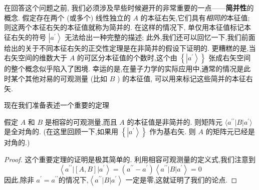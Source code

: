 \documentclass[lang=cn,newtx,10pt,scheme=chinese,thmcnt=section]{elegantbook}
\begin{document}
在回答这个问题之前, 我们必须涉及早些时候避开的非常重要的一点——\textbf{简并性}的概念. 假定存在两个 (或多个) 线性独立的 $A$ 的本征右矢,它们具有\textit{相同的}本征值; 则这两个本征右矢的本征值就称为简并的. 在这样的情况下, 单仅用本征值标记本征右矢的符号 $\left| {a}^{\prime }\right\rangle$ 无法给出一种完整的描述; 此外,我们还可以回忆一下,我们前面给出的关于不同本征右矢的正交性定理是在非简并的假设下证明的. 更糟糕的是,当右矢空间的维数大于 $A$ 的可区分本征值的个数时,这个由 $\left\{ \left| {a}^{\prime }\right\rangle \right\}$ 张成右矢空间的整个概念似乎陷入了困境. 幸运的是,在量子力学的实际应用中,通常的情况是此时某个其他对易的可观测量 (比如 $B$ ) 的本征值, 可以用来标记这些简并的本征右矢.

现在我们准备表述一个重要的定理
\begin{theorem}\label{thm:1.3.1} 
	假定 $A$ 和 $B$ 是相容的可观测量,而且 $A$ 的本征值是非简并的. 则矩阵元 $\langle {a}^{\prime \prime } \left| B\right| {a}^{\prime }\rangle$ 是全对角的. (在这里回顾一下,如果用 $\left\{ \left| {a}^{\prime }\right\rangle \right\}$ 作为基右矢. 则 $A$ 的矩阵元已经是对角的.)
\end{theorem}

\begin{proof}
	这个重要定理的证明是极其简单的. 利用相容可观测量的定义式,我们注意到
	\begin{equation}
		\left\langle {{a}^{\prime \prime }\left| \left\lbrack {A, B}\right\rbrack \right| {a}^{\prime }}\right\rangle = \left( {{a}^{\prime \prime } - {a}^{\prime }}\right) \left\langle {{a}^{\prime \prime }\left| B\right| {a}^{\prime }}\right\rangle = 0
	\end{equation}
	因此,除非 ${a}^{\prime } = {a}^{\prime \prime }$的情况下,$\left\langle {{a}^{\prime \prime }\left| B\right| {a}^{\prime }}\right\rangle$ 一定是零,这就证明了我们的论点.
\end{proof}
\end{document}
